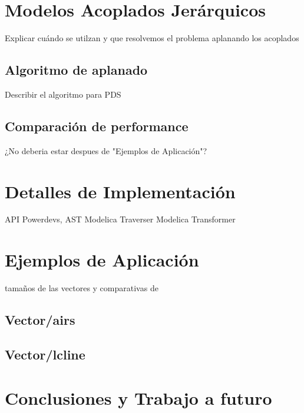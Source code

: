 \documentclass[a4paper,	11pt]{article}
\begin{document}
\section{Modelos Acoplados Jerárquicos}
Explicar cuándo se utilzan y que resolvemos el problema aplanando los acoplados

\subsection{Algoritmo de aplanado}
Describir el algoritmo para PDS


\subsection{Comparación de performance}
¿No deberia estar despues de "Ejemplos de Aplicación"?

\section{Detalles de Implementación}
API Powerdevs, AST Modelica
Traverser
Modelica Transformer


\section{Ejemplos de Aplicación}
tamaños de las vectores y comparativas de 
\subsection{Vector/airs}
\subsection{Vector/lcline}

\section{Conclusiones y Trabajo a futuro}


\begin{small}

\end{small}
\end{document}
